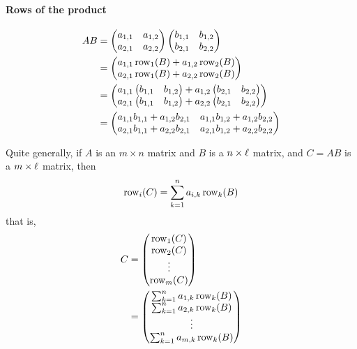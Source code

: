 \documentclass{ximera}
\begin{document}
\paragraph{Rows of the product}


\begin{align*}AB &= \begin{pmatrix}
a_{1,1} & a_{1,2}\\
a_{2,1} & a_{2,2}
\end{pmatrix}
\begin{pmatrix}
b_{1,1} & b_{1,2}\\
b_{2,1} & b_{2,2}
\end{pmatrix}\\
&= \begin{pmatrix}
a_{1,1}\operatorname{row}_1(B) + a_{1,2}\operatorname{row}_2(B) \\ a_{2,1}\operatorname{row}_1(B) +  a_{2,2}\operatorname{row}_2(B)
\end{pmatrix}\\
&= \begin{pmatrix}
a_{1,1}\begin{pmatrix} b_{1,1} & b_{1,2}\end{pmatrix} + a_{1,2}\begin{pmatrix} b_{2,1} & b_{2,2}\end{pmatrix} \\ a_{2,1}\begin{pmatrix} b_{1,1} & b_{1,2}\end{pmatrix} +  a_{2,2}\begin{pmatrix} b_{2,1} & b_{2,2}\end{pmatrix}
\end{pmatrix}\\
&= \begin{pmatrix}
a_{1,1}b_{1,1} + a_{1,2}b_{2,1} & a_{1,1}b_{1,2}+ a_{1,2}b_{2,2}\\
a_{2,1}b_{1,1} + a_{2,2}b_{2,1} & a_{2,1}b_{1,2} + a_{2,2}b_{2,2}
\end{pmatrix}
\end{align*}

Quite generally, if $A$ is an $m\times n$ matrix and $B$ is a $n\times
\ell$ matrix, and $C = AB$ is a $m\times \ell$ matrix, then
\[
\operatorname{row}_i(C) = \sum_{k=1}^n a_{i,k}\operatorname{row}_k(B)
\]
that is,
\begin{align*}
  C &= \begin{pmatrix} \operatorname{row}_1(C) \\ \operatorname{row}_2 (C) \\ \vdots \\ \operatorname{row}_{m}(C) \end{pmatrix}\\
  &=  \begin{pmatrix} \sum_{k=1}^n a_{1,k}\operatorname{row}_k(B) \\ \sum_{k=1}^n a_{2,k}\operatorname{row}_k(B) \\ \vdots \\ \sum_{k=1}^n a_{m,k}\operatorname{row}_k(B)\end{pmatrix}
\end{align*}
\end{document}
